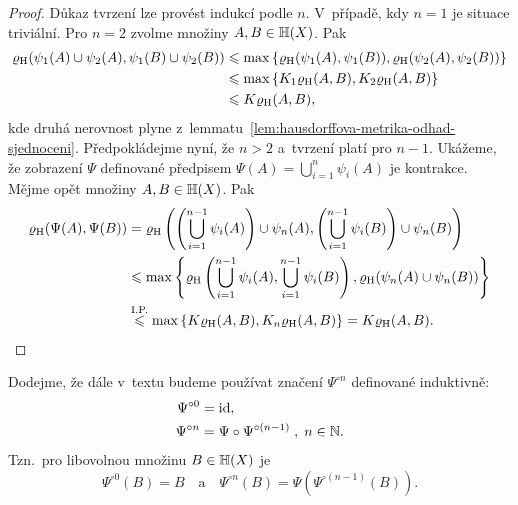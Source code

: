 \begin{proof}
    Důkaz tvrzení lze provést indukcí podle $n$. V~případě, kdy $n=1$ je situace triviální. Pro $n=2$ zvolme množiny $A,B\in\mathbb{H}(X)$. Pak
    \begin{align*}
        \varrho_\textup{H}(\psi_1(A)\cup\psi_2(A),\psi_1(B)\cup\psi_2(B))&\leqslant\max\left\{\varrho_\textup{H}(\psi_1(A),\psi_1(B)),\varrho_\textup{H}(\psi_2(A),\psi_2(B))\right\}\\
        &\leqslant\max\left\{K_1\varrho_\textup{H}(A,B),K_2\varrho_\textup{H}(A,B)\right\}\\
        &\leqslant K\varrho_\textup{H}(A,B),
    \end{align*}
    kde druhá nerovnost plyne z~lemmatu~\ref{lem:hausdorffova-metrika-odhad-sjednoceni}. Předpokládejme nyní, že $n>2$ a~tvrzení platí pro $n-1$. Ukážeme, že zobrazení $\Psi
    $ definované předpisem $\Psi(A)=\bigcup_{i=1}^n\psi_i(A)$ je kontrakce. Mějme opět množiny $A,B\in\mathbb{H}(X)$. Pak
    \begin{align*}
        \varrho_\textup{H}(\Psi(A),\Psi(B))&=\varrho_\textup{H}\left(\left(\bigcup_{i=1}^{n-1}\psi_i(A)\right)\cup\psi_n(A),\left(\bigcup_{i=1}^{n-1}\psi_i(B)\right)\cup\psi_n(B)\right)\\
        &\leqslant\max\left\{\varrho_\textup{H}\left(\bigcup_{i=1}^{n-1}\psi_i(A),\bigcup_{i=1}^{n-1}\psi_i(B)\right),\varrho_\textup{H}(\psi_n(A)\cup\psi_n(B))\right\}\\
        &\stackrel{\text{I.P.}}{\leqslant}\max\left\{K\varrho_\textup{H}(A,B),K_n\varrho_\textup{H}(A,B)\right\}=K\varrho_\textup{H}(A,B).
    \end{align*}
\end{proof}
\begin{denoting}
    Dodejme, že dále v~textu budeme používat značení $\Psi^{\circ n}$ definované induktivně:
    \begin{align*}
        \Psi^{\circ 0}&=\operatorname{id},\\
        \Psi^{\circ n}&=\Psi\circ\Psi^{\circ(n-1)}\;,\;n\in\mathbb{N}.
    \end{align*}
    Tzn.~pro libovolnou množinu $B\in\mathbb{H}(X)$ je
    \[\Psi^{\circ 0}(B)=B\quad\text{a}\quad\Psi^{\circ n}(B)=\Psi(\Psi^{\circ(n-1)}(B)).\]
\end{denoting}

